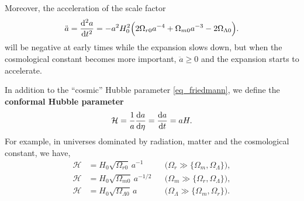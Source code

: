 \documentclass[10pt,a4paper]{article}
\begin{document}
Moreover, the acceleration of the scale factor
\begin{equation}
	\ddot{a} = \odv[2]{a}{t} = -a^2 H_0^2 \Big( 2 \Omega_{r0} a^{-4} + \Omega_{m0} a^{-3} - 2 \Omega_{\Lambda0} \Big).
\label{eq_acceleration}
\end{equation}
will be negative at early times while the expansion slows down,
but when the cosmological constant becomes more important, $\ddot{a} \geq 0$ and the expansion starts to accelerate.

In addition to the ``cosmic'' Hubble parameter \eqref{eq_friedmann},
we define the \textbf{conformal Hubble parameter}
\begin{equation}
	\mathcal{H} = \frac1a \odv{a}{\eta} = \odv{a}{t} = a H.
\label{eq_conformal_hubble}
\end{equation}
For example, in universes dominated by radiation, matter and the cosmological constant,
we have,
\begin{subequations}
\begin{align}
	\mathcal{H} &= H_0 \sqrt{\Omega_{r0}} \, a^{-1} && \Big( \Omega_r \gg \{\Omega_m,\Omega_\Lambda\} \Big), \label{eq_conformal_hubble_dominated_radiation} \\
	\mathcal{H} &= H_0 \sqrt{\Omega_{m0}} \, a^{-1/2} && \Big( \Omega_m \gg \{\Omega_r,\Omega_\Lambda\} \Big), \\
	\mathcal{H} &= H_0 \sqrt{\Omega_{\Lambda0}} \, a && \Big( \Omega_\Lambda \gg \{\Omega_m,\Omega_r\} \Big).
\end{align}
\label{eq_conformal_hubble_dominated}
\end{subequations}
\iffalse
\begin{equation}
	\mathcal{H} = \Bigg\{
		H_0 \sqrt{\Omega_{r0}} a^{-1}, \,\,
		H_0 \sqrt{\Omega_{m0}} a^{-1/2}, \,\,
		H_0 \sqrt{\Omega_{\Lambda0}} a
	\Bigg\}
\label{eq_conformal_hubble_dominated}
\end{equation}
\fi
\iffalse
\begin{equation}
\begin{aligned}
	\mathcal{H} &= H_0 \sqrt{\Omega_{r0}} e^{-x}, &
	\frac{\mathcal{H}'}{\mathcal{H}} &= -1, &
	\frac{\mathcal{H}''}{\mathcal{H}} &= 1 & \Big(\Omega_r \gg \{\Omega_m,\Omega_\Lambda\}\Big) \\
	\mathcal{H} &= H_0 \sqrt{\Omega_{r0}} e^{-\frac12x}, &
	\frac{\mathcal{H}'}{\mathcal{H}} &= -\frac12 &
	\frac{\mathcal{H}''}{\mathcal{H}} &= \frac14 & \Big(\Omega_m \gg \{\Omega_r,\Omega_\Lambda\}\Big) \\
	\mathcal{H} &= H_0 \sqrt{\Omega_{r0}} e^{+x}, &
	\frac{\mathcal{H}'}{\mathcal{H}} &= +1, &
	\frac{\mathcal{H}''}{\mathcal{H}} &= 1 & \Big(\Omega_\Lambda \gg \{\Omega_r,\Omega_m\}\Big).\\
\end{aligned}
\label{eq_conformal_hubble_dominated}
\end{equation}
\fi
\end{document}
